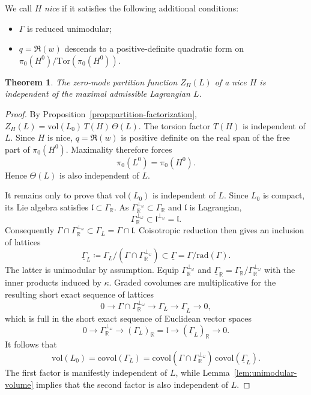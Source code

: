 \documentclass[12pt]{amsart}
\numberwithin{table}{section}
\numberwithin{equation}{section}
\newtheorem{thm}{Theorem}[section]
\theoremstyle{plain}
\newcommand{\fl}{\mathfrak{l}}
\newcommand{\R}{\mathbb{R}}
\newcommand{\rad}{\mathrm{rad}}
\newcommand{\Tor}{\mathrm{Tor}}
\newcommand{\vol}{\mathrm{vol}}
\newcommand{\covol}{\mathrm{covol}}
\begin{document}
We call $H$ \emph{nice} if it satisfies the following additional conditions:
\begin{itemize}
	\item $\Gamma$ is reduced unimodular;
	\item $q=\Re(w)$ descends to a positive-definite quadratic form on $\pi_0(H^0)/\Tor(\pi_0(H^0))$.
\end{itemize}

\begin{thm}\label{thm:L-independence}
The zero-mode partition function $Z_H(L)$ of a nice $H$ is independent of the maximal admissible Lagrangian $L$.
\end{thm}

\begin{proof}
By Proposition~\ref{prop:partition-factorization}, $Z_H(L)=\vol(L_0)\, T(H)\, \Theta(L)$. The torsion factor $T(H)$ is independent of $L$. Since $H$ is nice, $q=\Re(w)$ is positive definite on the real span of the free part of $\pi_0(H^0)$. Maximality therefore forces
\[
\pi_0(L^0)=\pi_0(H^0).
\]
Hence $\Theta(L)$ is also independent of $L$. 

It remains only to prove that $\vol(L_0)$ is independent of $L$. 
Since $L_0$ is compact, its Lie algebra satisfies $\fl\subset\Gamma_\R$. As $\Gamma_\R^{\perp_\omega} \subset \Gamma_\R$ and $\fl$ is Lagrangian,
\[
\Gamma_\R^{\perp_\omega} \subset \fl^{\perp_\omega}=\fl.
\]
Consequently $\Gamma\cap \Gamma_\R^{\perp_\omega} \subset\Gamma_L=\Gamma\cap\fl$. Coisotropic reduction then gives an inclusion of lattices
\[
\underline\Gamma_L \coloneq \Gamma_L/(\Gamma\cap \Gamma_\R^{\perp_\omega} )
\subset
\underline\Gamma = \Gamma/\rad(\Gamma).
\]
The latter is unimodular by assumption. Equip $\Gamma_\R^{\perp_\omega}$ and $\underline{\Gamma}_\R = \Gamma_\R/\Gamma_\R^{\perp_\omega}$ with the inner products induced by $\kappa$. Graded covolumes are multiplicative for the resulting short exact sequence of lattices
\[
0 \longrightarrow \Gamma\cap \Gamma_\R^{\perp_\omega} \longrightarrow \Gamma_L \longrightarrow \underline\Gamma_L \longrightarrow 0,
\]
which is full in the short exact sequence of Euclidean vector spaces
\[
0 \longrightarrow \Gamma_\R^{\perp_\omega} \longrightarrow (\Gamma_L)_\R = \fl \longrightarrow (\underline \Gamma_L)_\R \longrightarrow 0.
\]
It follows that
\[
\vol(L_0)
=
\covol(\Gamma_L)
=
\covol(\Gamma \cap \Gamma_\R^{\perp_\omega})\,
\covol(\underline\Gamma_L).
\]
The first factor is manifestly independent of $L$, while Lemma~\ref{lem:unimodular-volume} implies that the second factor is also independent of $L$.
\end{proof}
\end{document}
